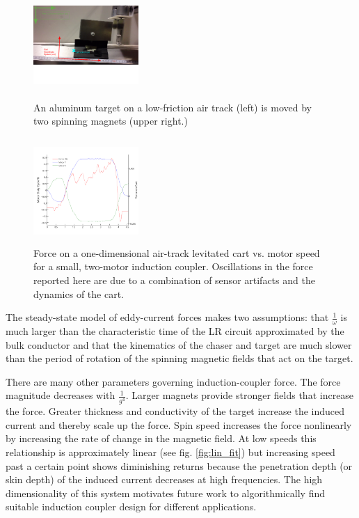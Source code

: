 \begin{figure}
\includegraphics[width = 4cm, height = 4cm ]{figures/cart_on_track.png}

\caption{An aluminum target on a low-friction air track (left) is moved by two spinning magnets (upper right.)}
\label{fig:cart_picture}
\end{figure}


\begin{figure}
\includegraphics[width = 4cm, height = 4cm ]{figures/motor_force_speed_plot.png}

\caption{Force on a one-dimensional air-track levitated cart vs. motor speed for a small, two-motor induction coupler. Oscillations in the force reported here are due to a combination of sensor artifacts and the dynamics of the cart.}
\label{fig:force_plot}
\end{figure}

The steady-state model of eddy-current forces makes two assumptions: that $\frac{1}{\omega}$ is much larger than the characteristic time of the LR circuit approximated by the bulk conductor and that the kinematics of the chaser and target are much slower than the period of rotation of the spinning magnetic fields that act on the target.

There are many other parameters governing induction-coupler force. The force magnitude decreases with $\frac{1}{g^4}$. Larger magnets provide stronger fields that increase the force. Greater thickness and 
conductivity of the target increase the induced current and thereby scale up the force. Spin speed increases the force nonlinearly by increasing the rate of change in the magnetic field. At low speeds this relationship is approximately linear (see fig. \ref{fig:lin_fit}) but increasing speed past a certain point shows diminishing returns because the penetration depth (or skin depth) of the induced current decreases at high frequencies. \cite{Paudel2013} The high dimensionality of this system motivates future work to algorithmically find suitable induction coupler design for different applications.